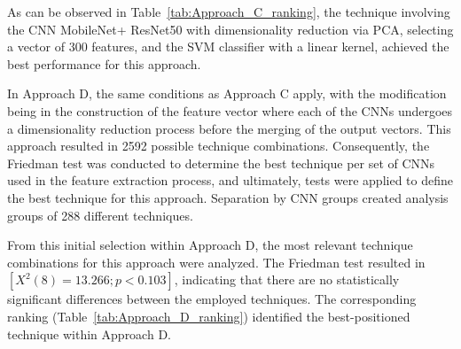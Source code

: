 \documentclass[final,5p,times,twocolumn]{elsarticle}
\begin{document}
As can be observed in Table~\ref{tab:Approach_C_ranking}, the technique involving the CNN MobileNet+ ResNet50 with dimensionality reduction via PCA, selecting a vector of 300 features, and the SVM classifier with a linear kernel, achieved the best performance for this approach.

In Approach D, the same conditions as Approach C apply, with the modification being in the construction of the feature vector where each of the CNNs undergoes a dimensionality reduction process before the merging of the output vectors. This approach resulted in 2592 possible technique combinations. Consequently, the Friedman test was conducted to determine the best technique per set of CNNs used in the feature extraction process, and ultimately, tests were applied to define the best technique for this approach. Separation by CNN groups created analysis groups of 288 different techniques.

From this initial selection within Approach D, the most relevant technique combinations for this approach were analyzed. The Friedman test resulted in $[X^2(8)=13.266; p<0.103]$, indicating that there are no statistically significant differences between the employed techniques. The corresponding ranking (Table~\ref{tab:Approach_D_ranking}) identified the best-positioned technique within Approach D.
\end{document}
